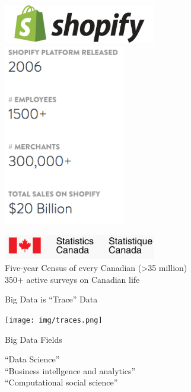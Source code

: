 \documentclass{beamer}
\begin{document}
\begin{frame}[plain]
  \begin{center}
      \includegraphics[width=0.5\textwidth]{img/shopify-logo.png} \\

      \includegraphics[width=0.4\textwidth]{img/shopify-stats.png}
  \end{center}
\end{frame}

\begin{frame}[plain]
  \begin{center}
      \includegraphics[width=0.5\textwidth]{img/stats-can.png} \\
      Five-year Census of every Canadian (>35 million) \\
      350+ active surveys on Canadian life
  \end{center}
\end{frame}

\begin{frame}{Big Data is ``Trace'' Data}
  \begin{center}
    \texttt{[image: img/traces.png]} 
  \end{center}
\end{frame}

\begin{frame}{Big Data Fields}
    \begin{center}
        ``Data Science'' \\
        ``Business intellgence and analytics'' \\
        ``Computational social science''
    \end{center}
\end{frame}
\end{document}
